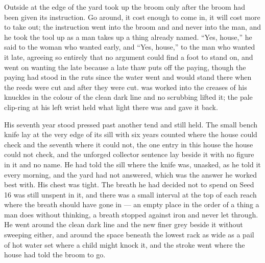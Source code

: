 \scenebreak

Outside at the edge of the yard  took up the broom only after the broom had been given its instruction. Go around, it cost enough to come in, it will cost more to take out; the instruction went into the broom and  and never into the man, and he took the tool up as a man takes up a thing already named. “Yes, house,” he said to the woman who wanted  early, and “Yes, house,” to the man who wanted it late, agreeing so entirely that no argument could find a foot to stand on, and went on wanting the late because a late thaw puts off the paying, though the paying had stood in the ruts since the water went and would stand there when the reeds were cut and after they were cut.  was worked into the creases of his knuckles in the colour of the clean dark line and no scrubbing lifted it; the pale clip-ring at his left wrist held what light there was and gave it back.

His seventh year stood pressed past another tend and still held. The small bench knife lay at the very edge of its sill with six years counted where the house could check and the seventh where it could not, the one entry in this house the house could not check, and the unforged collector sentence lay beside it with no figure in it and no name. He had told the sill where the knife was, unasked, as he told it every morning, and the yard had not answered, which was the answer he worked best with. His chest was tight. The breath he had decided not to spend on Seed 16 was still unspent in it, and there was a small interval at the top of each reach where the breath should have gone in --- an empty place in the order of a thing a man does without thinking, a breath stopped against iron and never let through. He went around the clean dark line and the new finer grey beside it without sweeping either, and around the space beneath the lowest rack as wide as a pail of hot water set where a child might knock it, and the stroke went where the house had told the broom to go.

